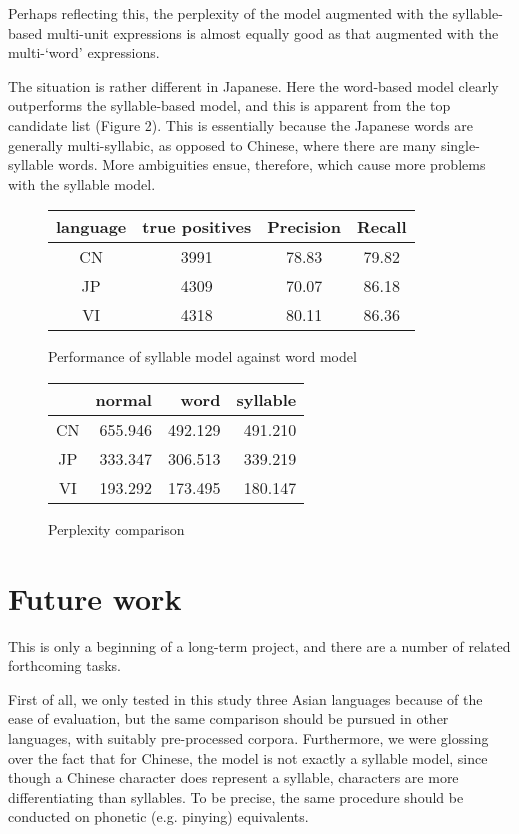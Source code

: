 \documentclass{article}
\begin{document}
Perhaps reflecting this, the perplexity of the model augmented with the syllable-based multi-unit expressions is almost equally good as that augmented with the multi-`word' expressions. 

The situation is rather different in Japanese. Here the word-based model clearly outperforms the syllable-based model, and this is apparent from the top candidate list (Figure 2). This is essentially because the Japanese words are generally multi-syllabic, as opposed to Chinese, where there are many single-syllable words. More ambiguities ensue, therefore, which cause more problems with the syllable model.  

\begin{figure}[h]
\centering
\begin{tabular}{c|c|c|c}


language&true positives& Precision & Recall \\
\hline
CN & 3991& 78.83 &  79.82 \\
JP & 4309& 70.07 & 86.18  \\
VI & 4318& 80.11 &  86.36\\

\end{tabular}
\caption{Performance of syllable model against word model}
\label{modelComparison}
\end{figure}


\begin{figure}[h]
\centering
\begin{tabular}{c|r|r|r}

  & normal & word & syllable\\
\hline
CN & 655.946 & 492.129 & 491.210\\
JP & 333.347 & 306.513 & 339.219\\
VI & 193.292 & 173.495 & 180.147\\

\end{tabular}
\caption{Perplexity comparison}
\label{perplexityComparison}
\end{figure}

\section{Future work}

This is only a beginning of a long-term project, and there are a number of related forthcoming tasks. 

First of all, we only tested in this study three Asian languages because of the ease of evaluation, but the same comparison should be pursued in other languages, with suitably pre-processed corpora. Furthermore, we were glossing over the fact that for Chinese, the model is not exactly a syllable model, since though a Chinese character does represent a syllable, characters are more differentiating than syllables. To be precise, the same procedure should be conducted on phonetic (e.g. pinying) equivalents.
\end{document}
